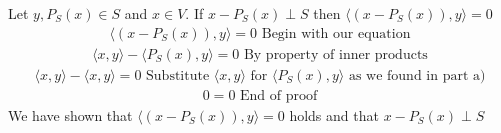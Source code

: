 \documentclass[12pt,twoside]{article}
\begin{document}
Let $y, P_S(x) \in S$ and $x \in V$. If $x-P_S(x) \perp S$ then $ \langle (x-P_S(x)),y \rangle = 0 $
\begin{equation}
    \begin{split}
         \langle (x-P_S(x)),y \rangle = 0 \text{ Begin with our equation}
    \end{split}
\end{equation}
   \begin{equation}
    \begin{split}
         \langle x,y \rangle - \langle P_S(x),y \rangle = 0 \text{ By property of inner products}
    \end{split}
\end{equation}
   \begin{equation}
    \begin{split}
         \langle x,y \rangle - \langle x,y \rangle = 0 \text{ Substitute $\langle x,y \rangle$ for $\langle P_S(x),y \rangle$ as we found in part a)}
    \end{split}
\end{equation}
  \begin{equation}
    \begin{split}
         0 = 0 \text{ End of proof}
    \end{split}
\end{equation}
We have shown that $ \langle (x-P_S(x)),y \rangle = 0 $ holds and that $x-P_S(x) \perp S$ \\
\end{document}
